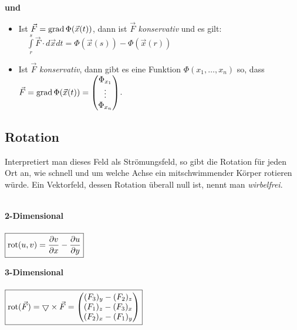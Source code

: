   \textbf{und}
  \begin{itemize}
    \item Ist $\vec{F}=\operatorname{grad} \Phi(\vec{x}(t))$, dann ist $\vec{F}$  
    \textit{konservativ} und es gilt: $\quad\int\limits_r^s \vec{F}\cdot d\vec{x}
    dt=\Phi(\vec{x}(s))-\Phi(\vec{x}(r))$
    \item Ist $\vec{F}$ \textit{konservativ}, dann gibt es eine Funktion
    $\Phi(x_1,\ldots,x_n)$ so, dass $\vec{F}=\operatorname{grad} \Phi(\vec{x}(t))=
    \begin{pmatrix}
      \Phi_{x_1}\\
      \vdots\\ 
      \Phi_{x_n}
    \end{pmatrix}$.

  \end{itemize}


\subsection{Rotation}
  Interpretiert man dieses Feld als Strömungsfeld, so gibt die Rotation für jeden
  Ort an, wie schnell und um welche Achse ein mitschwimmender Körper rotieren
  würde. Ein Vektorfeld, dessen Rotation überall null ist, nennt man
  \textit{wirbelfrei}.\\\\
  \begin{minipage}{8cm}
    	\textbf{2-Dimensional}\\\\
    	$\boxed{\operatorname{rot}(u,v)=\dfrac{\partial v}{\partial x}-\dfrac{\partial u}{\partial y}}$
  \end{minipage}
  \begin{minipage}{8cm}
	  \textbf{3-Dimensional}\\\\
    	$\boxed{\operatorname{rot}(\vec F)=\bigtriangledown\times\vec{F} = 
    	\begin{pmatrix}
    	  (F_3)_y - (F_2)_z\\
    	  (F_1)_z - (F_3)_x\\
    	  (F_2)_x - (F_1)_y
    	\end{pmatrix}}$
  \end{minipage} \\

